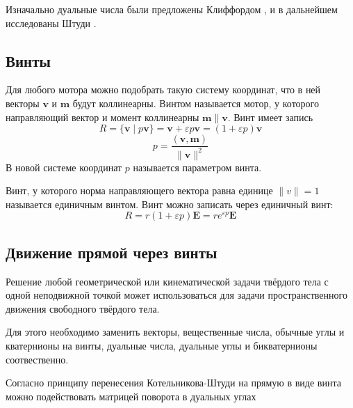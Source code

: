   Изначально дуальные числа были предложены Клиффордом \autocite{cliffordPreliminarySketchBiquaternions1871},
  и в дальнейшем исследованы Штуди \autocite{zindlerGeometrieDynamenStudy1903}.

  \subsection{Винты}

  Для любого мотора можно подобрать такую систему координат, что в ней векторы $\mathbf{v}$ и $\mathbf{m}$ будут коллинеарны. 
  Винтом называется мотор, у которого направляющий вектор и момент коллинеарны $\mathbf{m} \| \mathbf{v}$. Винт имеет запись
  \begin{equation*}
    R = \{ \mathbf{v} \mid p\mathbf{v} \} = \mathbf{v} + \varepsilon p \mathbf{v} = (1+\varepsilon p)\mathbf{v}
  \end{equation*}
  \begin{equation*}
    p=\frac{(\mathbf{v}, \mathbf{m})}{\| \mathbf{v} \|^2}
  \end{equation*}
  В новой системе координат $p$ называется параметром винта.

  Винт, у которого норма направляющего вектора равна единице $\| v \| = 1$ называется единичным винтом. Винт можно записать через единичный винт:
  \begin{equation*}
    R = r(1+\varepsilon p)\mathbf{E} = r e^{\varepsilon p}\mathbf{E}
  \end{equation*}

  \subsection{Движение прямой через винты}
  
  \begin{theo}%
  \label{theo:one}  

    Решение любой геометрической или кинематической задачи твёрдого тела с одной неподвижной точкой может использоваться для задачи пространственного движения 
    свободного твёрдого тела.

    Для этого необходимо заменить векторы, вещественные числа, обычные углы и кватернионы на винты, дуальные числа, дуальные углы и бикватернионы соотвественно. 
  \end{theo}

  Согласно принципу перенесения Котельникова-Штуди на прямую в виде винта можно подействовать матрицей поворота в дуальных углах
  
